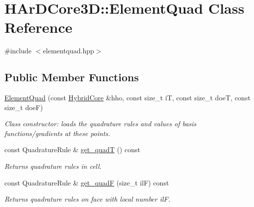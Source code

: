 \hypertarget{classHArDCore3D_1_1ElementQuad}{}\section{H\+Ar\+D\+Core3D\+:\+:Element\+Quad Class Reference}
\label{classHArDCore3D_1_1ElementQuad}


{\ttfamily \#include $<$elementquad.\+hpp$>$}

\subsection*{Public Member Functions}
\begin{DoxyCompactItemize}
\item 
\hyperlink{classHArDCore3D_1_1ElementQuad_a0d27ba99f9f3e6f2a3e5311e6be19eba}{Element\+Quad} (const \hyperlink{classHArDCore3D_1_1HybridCore}{Hybrid\+Core} \&hho, const size\+\_\+t iT, const size\+\_\+t doeT, const size\+\_\+t doeF)
\begin{DoxyCompactList}\small\item\em Class constructor\+: loads the quadrature rules and values of basis functions/gradients at these points. \end{DoxyCompactList}\item 
\mbox{\label{classHArDCore3D_1_1ElementQuad_af8ee9bc271f5b73902b87f68f46f51f5}} 
const Quadrature\+Rule \& \hyperlink{classHArDCore3D_1_1ElementQuad_af8ee9bc271f5b73902b87f68f46f51f5}{get\+\_\+quadT} () const
\begin{DoxyCompactList}\small\item\em Returns quadrature rules in cell. \end{DoxyCompactList}\item 
\mbox{\label{classHArDCore3D_1_1ElementQuad_a9e734ea29a3c4e0403bb5aea2ba910e3}} 
const Quadrature\+Rule \& \hyperlink{classHArDCore3D_1_1ElementQuad_a9e734ea29a3c4e0403bb5aea2ba910e3}{get\+\_\+quadF} (size\+\_\+t ilF) const
\begin{DoxyCompactList}\small\item\em Returns quadrature rules on face with local number ilF. \end{DoxyCompactList}\item 
\mbox{\label{classHArDCore3D_1_1ElementQuad_aa56cdde521a902082ce050928893804d}} 

\end{DoxyCompactItemize}
